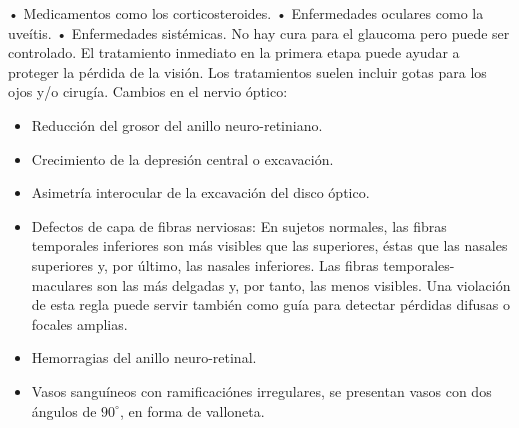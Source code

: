 \begin{description}
•	Medicamentos como los corticosteroides.
•	Enfermedades oculares como la uve\'itis.
•	Enfermedades sist\'emicas.
No hay cura para el glaucoma pero puede ser controlado. El tratamiento inmediato en la primera etapa puede ayudar a proteger la p\'erdida de la visi\'on. Los tratamientos suelen incluir gotas para los ojos y/o cirug\'ia.
Cambios en el nervio \'optico:
\begin{itemize}
	\item Reducci\'on del grosor del anillo neuro-retiniano.
	\item Crecimiento de la depresi\'on central o excavaci\'on.
	\item Asimetr\'ia interocular de la excavaci\'on del disco \'optico.
	\item Defectos de capa de fibras nerviosas: En sujetos normales, las fibras temporales inferiores son m\'as visibles que las superiores, \'estas que las nasales superiores y, por \'ultimo, las nasales inferiores. Las fibras temporales-maculares son las m\'as delgadas y, por tanto, las menos visibles. Una violaci\'on de esta regla puede servir tambi\'en como gu\'ia para detectar p\'erdidas difusas o focales amplias.
	\item Hemorragias del anillo neuro-retinal.
	\item Vasos sangu\'ineos con ramificaci\'ones irregulares, se presentan vasos con dos ángulos de $90^{\circ}$, en forma de valloneta.
\end{itemize}
\end{description}
 

